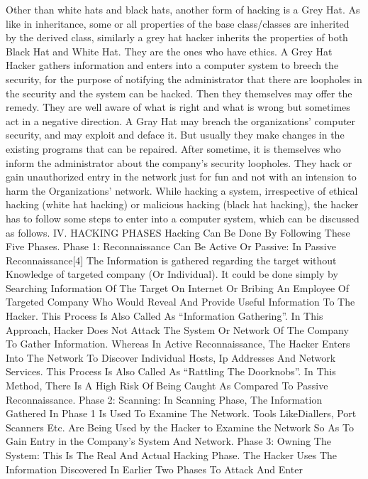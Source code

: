  Other than white hats and black hats, another form of 
hacking is a Grey Hat. As like in inheritance, some or all 
properties of the base class/classes are inherited by the 
derived class, similarly a grey hat hacker inherits the 
properties of both Black Hat and White Hat. They are the 
ones who have ethics. A Grey Hat Hacker gathers 
information and enters into a computer system to breech 
the security, for the purpose of notifying the administrator 
that there are loopholes in the security and the system can 
be hacked. Then they themselves may offer the remedy. 
They are well aware of what is right and what is wrong but 
sometimes act in a negative direction. A Gray Hat may 
breach the organizations’ computer security, and may 
exploit and deface it. But usually they make changes in the 
existing programs that can be repaired. After sometime, it 
is themselves who inform the administrator about the 
company’s security loopholes. They hack or gain 
unauthorized entry in the network just for fun and not with 
an intension to harm the Organizations’ network. While 
hacking a system, irrespective of ethical hacking (white hat 
hacking) or malicious hacking (black hat hacking), the 
hacker has to follow some steps to enter into a computer 
system, which can be discussed as follows. 
IV. HACKING PHASES 
Hacking Can Be Done By Following These Five Phases. 
 Phase 1: Reconnaissance Can Be Active Or Passive: In 
Passive Reconnaissance[4] The Information is gathered 
regarding the target without Knowledge of targeted 
company (Or Individual). It could be done simply by 
Searching Information Of The Target On Internet Or 
Bribing An Employee Of Targeted Company Who Would 
Reveal And Provide Useful Information To The Hacker. 
This Process Is Also Called As “Information Gathering”. In 
This Approach, Hacker Does Not Attack The System Or 
Network Of The Company To Gather Information. 
Whereas In Active Reconnaissance, The Hacker Enters Into 
The Network To Discover Individual Hosts, Ip Addresses 
And Network Services. This Process Is Also Called As 
“Rattling The Doorknobs”. In This Method, There Is A 
High Risk Of Being Caught As Compared To Passive 
Reconnaissance. 
Phase 2: Scanning: In Scanning Phase, The Information 
Gathered In Phase 1 Is Used To Examine The Network. 
Tools LikeDiallers, Port Scanners Etc. Are Being Used by 
the Hacker to Examine the Network So As To Gain Entry 
in the Company’s System And Network.  
Phase 3: Owning The System: This Is The Real And 
Actual Hacking Phase. The Hacker Uses The Information 
Discovered In Earlier Two Phases To Attack And Enter 
